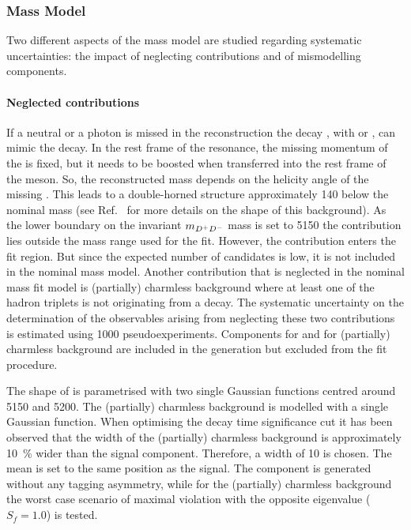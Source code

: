 
\subsubsection{Mass Model}
\label{sec:b02dd:systematics:massmodel}

Two different aspects of the mass model are studied regarding systematic
uncertainties: the impact of neglecting contributions and of mismodelling
components.

\paragraph{Neglected contributions}

If a neutral \piz or a photon is missed in the reconstruction the decay
\BToDstD, with \DstpToDpizero or \DstpToDgamma, can mimic the \BToDD decay. In
the rest frame of the \Dstarp resonance, the missing momentum of the \piz is
fixed, but it needs to be boosted when transferred into the rest frame of the
\PB meson. So, the reconstructed mass depends on the helicity angle of the
missing \piz. This leads to a double-horned structure approximately
\SI{140}{\MeVcc} below the nominal \PB mass (see Ref.~\cite{LHCb-ANA-2014-015}
for more details on the shape of this background). As the lower boundary on
the invariant $m_{{{D}^+}{{D}^-}}$ mass is set to \SI{5150}{\MeVcc} the \BdToDstD
contribution lies outside the mass range used for the fit. However, the
\BsToDstD contribution enters the fit region. But since the expected number of
\BsToDstD candidates is low, it is not included in the nominal mass model.
Another contribution that is neglected in the nominal mass fit model is
(partially) charmless background where at least one of the hadron triplets is
not originating from a \PD decay. The systematic uncertainty on the
determination of the \CP observables arising from neglecting these two
contributions is estimated using \num{1000} pseudoexperiments. Components for
\BsToDstD and for (partially) charmless background are included in the
generation but excluded from the fit procedure.

The shape of \BsToDstD is parametrised with two single Gaussian functions
centred around \SI{5150}{\MeVcc} and \SI{5200}{\MeVcc}. The (partially)
charmless background is modelled with a single Gaussian function. When
optimising the decay time significance cut it has been observed that the width
of the (partially) charmless background is approximately \SI{10}{\percent}
wider than the signal component. Therefore, a width of \SI{10}{\MeVcc} is
chosen. The mean is set to the same position as the \Bd signal. The \BsToDstD
component is generated without any tagging asymmetry, while for the (partially)
charmless background the worst case scenario of maximal \CP violation with the
opposite \CP eigenvalue ($S_f = \num{+1.0}$) is tested.

